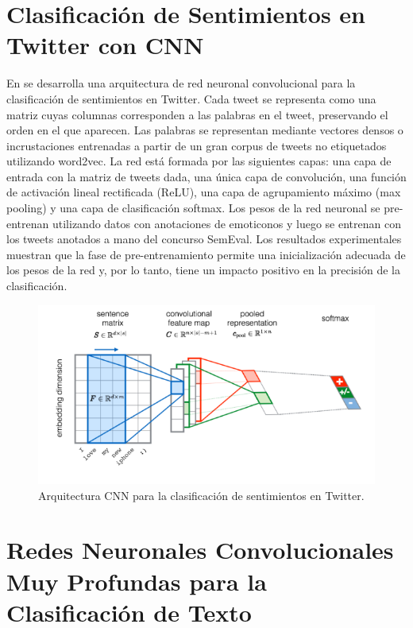 \section{Clasificación de Sentimientos en Twitter con CNN}

En \cite{Severyn2015} se desarrolla una arquitectura de red neuronal convolucional para la clasificación de sentimientos en Twitter. Cada tweet se representa como una matriz cuyas columnas corresponden a las palabras en el tweet, preservando el orden en el que aparecen. Las palabras se representan mediante vectores densos o incrustaciones entrenadas a partir de un gran corpus de tweets no etiquetados utilizando word2vec. La red está formada por las siguientes capas: una capa de entrada con la matriz de tweets dada, una única capa de convolución, una función de activación lineal rectificada (ReLU), una capa de agrupamiento máximo (max pooling) y una capa de clasificación softmax. Los pesos de la red neuronal se pre-entrenan utilizando datos con anotaciones de emoticonos y luego se entrenan con los tweets anotados a mano del concurso SemEval. Los resultados experimentales muestran que la fase de pre-entrenamiento permite una inicialización adecuada de los pesos de la red y, por lo tanto, tiene un impacto positivo en la precisión de la clasificación.

\begin{figure}[h]
  \centering
  \includegraphics[scale=0.45]{pics/cnn-twitter.png}
  \caption{Arquitectura CNN para la clasificación de sentimientos en Twitter.}
  \label{fig:cnn-twitter}
\end{figure}

\section{Redes Neuronales Convolucionales Muy Profundas para la Clasificación de Texto}


